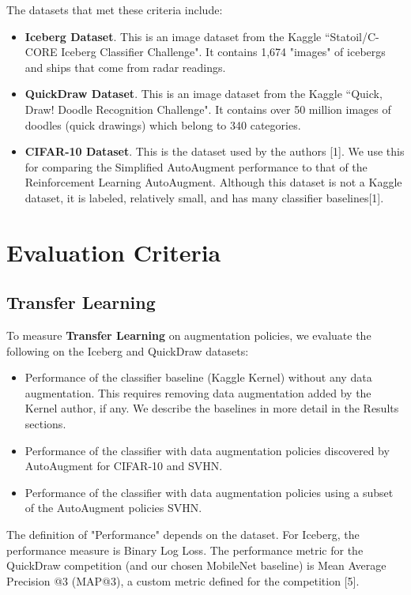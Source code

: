 \documentclass[10pt,twocolumn,letterpaper]{article}
\begin{document}
The datasets that met these criteria include:

\begin{itemize}
  \item \textbf{Iceberg Dataset}.  This is an image dataset from the Kaggle “Statoil/C-CORE Iceberg Classifier Challenge".  It contains 1,674 "images" of icebergs and ships that come from radar readings.  
  \item \textbf{QuickDraw Dataset}.  This is an image dataset from the Kaggle “Quick, Draw! Doodle Recognition Challenge".  It contains over 50 million images of doodles (quick drawings) which belong to 340 categories.  
  \item \textbf{CIFAR-10 Dataset}.  This is the dataset used by the authors [1].  We use this for comparing the Simplified AutoAugment performance to that of the Reinforcement Learning AutoAugment.  Although this dataset is not a Kaggle dataset, it is labeled, relatively small, and has many classifier baselines[1].        
\end{itemize}


\section{Evaluation Criteria}

\subsection{Transfer Learning}

To measure \textbf{Transfer Learning} on augmentation policies, we evaluate the following on the Iceberg and QuickDraw datasets:

\begin{itemize}
  \item Performance of the classifier baseline (Kaggle Kernel) without any data augmentation.  This requires removing data augmentation added by the Kernel author, if any.  We describe the baselines in more detail in the Results sections.
  \item Performance of the classifier with data augmentation policies discovered by AutoAugment for CIFAR-10 and SVHN.  
  \item Performance of the classifier with data augmentation policies using a subset of the AutoAugment policies SVHN.  
\end{itemize}

The definition of "Performance" depends on the dataset.  For Iceberg, the performance measure is Binary Log Loss.  The performance metric for the QuickDraw competition (and our chosen MobileNet baseline) is Mean Average Precision @3 (MAP@3), a custom metric defined for the competition [5].
\end{document}
